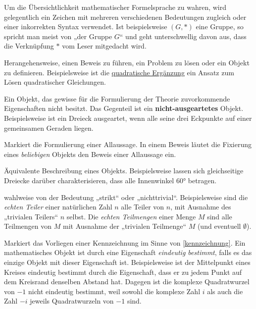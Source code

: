 \begin{description}[labelindent=0pt, leftmargin=0pt]

    \item[abuse of notation:] Um die Übersichtlichkeit mathematischer Formelsprache zu wahren, wird gelegentlich ein Zeichen mit mehreren verschiedenen Bedeutungen zugleich oder einer inkorrekten Syntax verwendet. Ist beispielsweise $(G,*)$ eine Gruppe, so spricht man meist von „der Gruppe $G$“ und geht unterschwellig davon aus, dass die Verknüpfung $*$ vom Leser mitgedacht wird.

    \item[Ansatz:] Herangehensweise, einen Beweis zu führen, ein Problem zu lösen oder ein Objekt zu definieren. Beispielsweise ist die \href{https://en.wikipedia.org/wiki/Completing_the_square}{quadratische Ergänzung} ein Ansatz zum Lösen quadratischer Gleichungen.

    \item[Ausgeartet:] Ein Objekt, das gewisse für die Formulierung der Theorie zuvorkommende Eigenschaften nicht besitzt. Das Gegenteil ist ein \textbf{nicht-ausgeartetes} Objekt. Beispielsweise ist ein Dreieck ausgeartet, wenn alle seine drei Eckpunkte auf einer gemeinsamen Geraden liegen.

    \item[Beliebig:] Markiert die Formulierung einer Allaussage. In einem Beweis läutet die Fixierung eines \emph{beliebigen} Objekts den Beweis einer Allaussage ein.

    \item[Charakterisierung:] Äquivalente Beschreibung eines Objekts. Beispielsweise lassen sich gleichseitige Dreiecke darüber charakterisieren, dass alle Innenwinkel 60° betragen.

    \item[Echt:] wahlweise von der Bedeutung „strikt“ oder „nichttrivial“. Beispielsweise sind die \emph{echten Teiler} einer natürlichen Zahl $n$ alle Teiler von $n$, mit Ausnahme des „trivialen Teilers“ $n$ selbst. Die \emph{echten Teilmengen} einer Menge $M$ sind alle Teilmengen von $M$ mit Ausnahme der „trivialen Teilmenge“ $M$ (und eventuell $\emptyset$).

    \item[Eindeutig bestimmt:] Markiert das Vorliegen einer Kennzeichnung im Sinne von \cref{kennzeichnung}. Ein mathematisches Objekt ist durch eine Eigenschaft \emph{eindeutig bestimmt}, falls es das einzige Objekt mit dieser Eigenschaft ist. Beispielsweise ist der Mittelpunkt eines Kreises eindeutig bestimmt durch die Eigenschaft, dass er zu jedem Punkt auf dem Kreisrand denselben Abstand hat. Dagegen ist die komplexe Quadratwurzel von $-1$ nicht eindeutig bestimmt, weil sowohl die komplexe Zahl $i$ als auch die Zahl $-i$ jeweils Quadratwurzeln von $-1$ sind.


\end{description}
